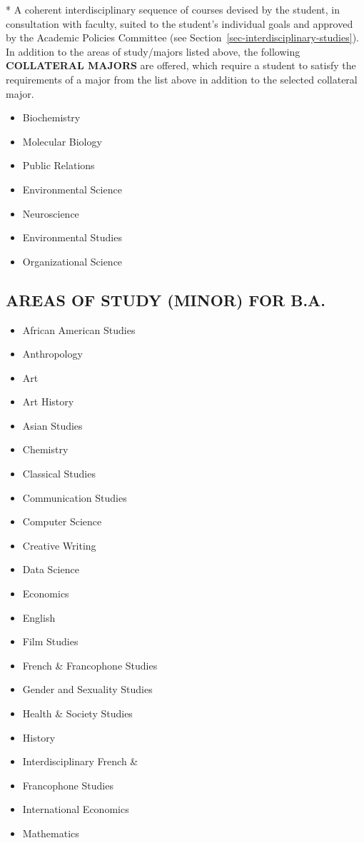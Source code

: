 \documentclass[
  letterpaper,
]{scrbook}
\providecommand{\tightlist}{%
  \setlength{\itemsep}{0pt}\setlength{\parskip}{0pt}}
\begin{document}
* A coherent interdisciplinary sequence of courses devised by the
student, in consultation with faculty, suited to the student's
individual goals and approved by the Academic Policies Committee (see
Section~\ref{sec-interdisciplinary-studies}). In addition to the areas
of study/majors listed above, the following \textbf{COLLATERAL MAJORS}
are offered, which require a student to satisfy the requirements of a
major from the list above in addition to the selected collateral major.

\begin{itemize}
\tightlist
\item
  Biochemistry
\item
  Molecular Biology
\item
  Public Relations
\item
  Environmental Science
\item
  Neuroscience
\item
  Environmental Studies
\item
  Organizational Science
\end{itemize}

\subsection{AREAS OF STUDY (MINOR) FOR
B.A.}\label{areas-of-study-minor-for-b.a.}

\begin{itemize}
\tightlist
\item
  African American Studies
\item
  Anthropology
\item
  Art
\item
  Art History
\item
  Asian Studies
\item
  Chemistry
\item
  Classical Studies
\item
  Communication Studies
\item
  Computer Science
\item
  Creative Writing
\item
  Data Science
\item
  Economics
\item
  English
\item
  Film Studies
\item
  French \& Francophone Studies
\item
  Gender and Sexuality Studies
\item
  Health \& Society Studies
\item
  History
\item
  Interdisciplinary French \&
\item
  Francophone Studies
\item
  International Economics
\item
  Mathematics
\end{itemize}
\end{document}
